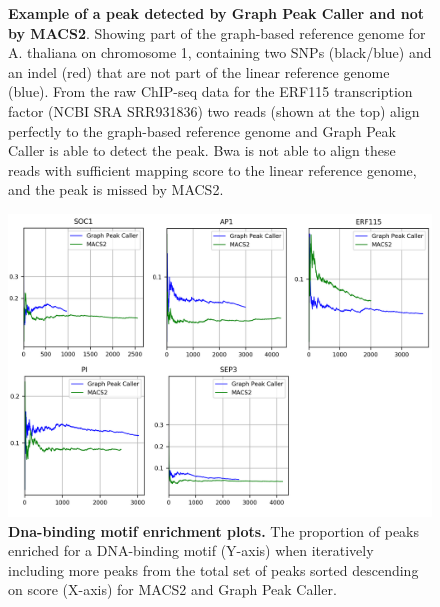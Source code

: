 \documentclass[10pt,letterpaper]{article}
\begin{document}
\begin{figure}[!h]
 \caption{{\bf Example of a peak detected by Graph Peak Caller and not by MACS2}. Showing part of the graph-based reference genome for A. thaliana on chromosome 1, containing two SNPs (black/blue) and an indel (red) that are not part of the linear reference genome (blue). From the raw ChIP-seq data for the ERF115 transcription factor (NCBI SRA SRR931836) two reads (shown at the top) align perfectly to the graph-based reference genome and Graph Peak Caller is able to detect the peak. Bwa is not able to align these reads with sufficient mapping score to the linear reference genome, and the peak is missed by MACS2. }

\label{motif_enrichment_reads}
\end{figure}


\begin{figure}[!h]
 \includegraphics[width=1.0\textwidth]{figures/Fig4.png}
 \caption{{\bf Dna-binding motif enrichment plots.} The proportion of peaks enriched for a DNA-binding motif (Y-axis) when iteratively including more peaks from the total set of peaks sorted descending on score (X-axis) for MACS2 and Graph Peak Caller. }
\label{motif_plots}
\end{figure}
\end{document}
